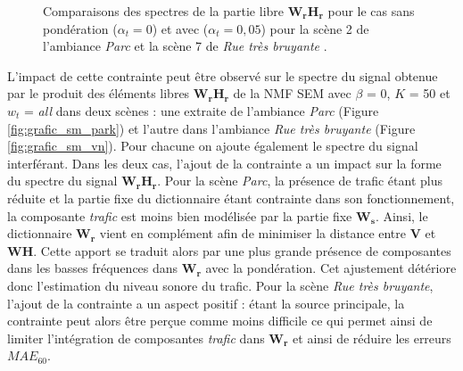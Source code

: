 \begin{figure}[h!]
\centering
{}%
\qquad
{}%
\caption{Comparaisons des spectres de la partie libre $\mathbf{W_rH_r}$ pour le cas sans pondération ($\alpha_{t}= 0$) et avec ($\alpha_t = 0,05$) pour la scène 2 de l'ambiance \textit{Parc}  et la scène 7 de \textit{Rue très bruyante} .}
\label{fig:grafic_sm}
\end{figure}

L'impact de cette contrainte peut être observé sur le spectre du signal obtenue par le produit des éléments libres $\mathbf{W_rH_r} $ de la NMF SEM avec $\beta$ = 0, $K$ = 50 et $w_t$ = \textit{all} dans deux scènes : une extraite de l'ambiance \textit{Parc} (Figure \ref{fig:grafic_sm_park}) et l'autre dans l'ambiance \textit{Rue très bruyante} (Figure \ref{fig:grafic_sm_vn}). Pour chacune on ajoute également le spectre du signal interférant. Dans les deux cas, l'ajout de la contrainte a un impact sur la forme du spectre du signal $\mathbf{W_rH_r}$. Pour la scène \textit{Parc}, la présence de trafic étant plus réduite et la partie fixe du dictionnaire étant contrainte dans son fonctionnement, la composante \textit{trafic} est moins bien modélisée par la partie fixe $\mathbf{W_s}$. Ainsi, le dictionnaire $\mathbf{W_r}$ vient en complément afin de minimiser la distance entre $\mathbf{V}$ et $\mathbf{WH}$. Cette apport se traduit alors par une plus grande présence de composantes dans les basses fréquences dans $\mathbf{W_r}$ avec la pondération. Cet ajustement détériore donc l'estimation du niveau sonore du trafic. Pour la scène \textit{Rue très bruyante}, l'ajout de la contrainte a un aspect positif : étant la source principale, la contrainte peut alors être perçue comme moins \og difficile \fg{} ce qui permet ainsi de limiter l'intégration de composantes \textit{trafic} dans $\mathbf{W_r}$ et ainsi de réduire les erreurs $MAE_{60}$.


